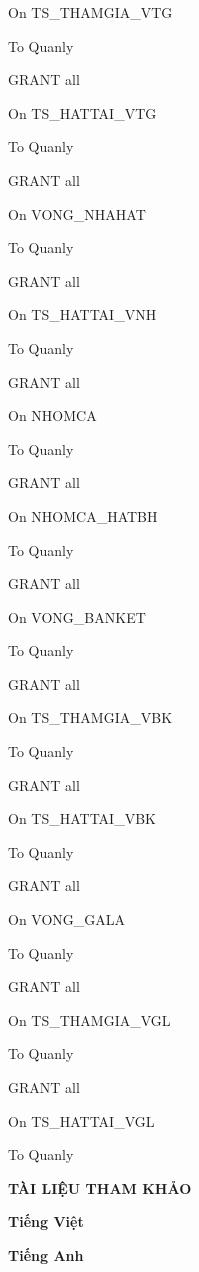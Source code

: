 \documentclass{report}
\begin{document}
On TS\_THAMGIA\_VTG

To Quanly

\bigskip

GRANT all

On TS\_HATTAI\_VTG 

To Quanly

\bigskip

GRANT all

On VONG\_NHAHAT

To Quanly

\bigskip

GRANT all

On TS\_HATTAI\_VNH

To Quanly

\bigskip

GRANT all

On NHOMCA 

To Quanly

\bigskip

GRANT all

On NHOMCA\_HATBH 

To Quanly

\bigskip

GRANT all

On VONG\_BANKET

To Quanly

\bigskip

GRANT all

On TS\_THAMGIA\_VBK

To Quanly

\bigskip

GRANT all

On TS\_HATTAI\_VBK

To Quanly

\bigskip

GRANT all

On VONG\_GALA

To Quanly

\bigskip

GRANT all

On TS\_THAMGIA\_VGL

To Quanly

\bigskip

GRANT all

On TS\_HATTAI\_VGL

To Quanly

\bigskip


\setlength{\parindent}{0.5cm}




\newpage



\newpage
\newpage
\changefontsizes{16pt}
\centerline{\textbf{TÀI LIỆU THAM KHẢO}}

\vspace{1.2cm}
\changefontsizes{14pt}
\textbf{Tiếng Việt}



\vspace{3cm}
\textbf{Tiếng Anh}
\end{document}
